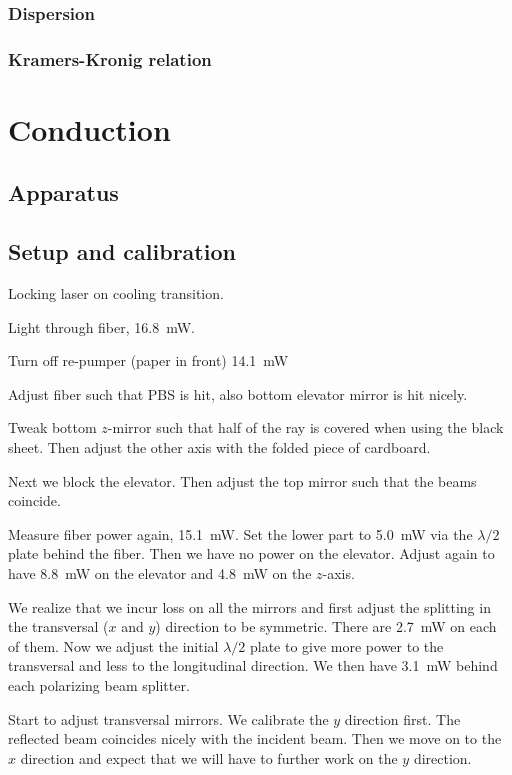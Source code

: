 \documentclass[11pt, english, fleqn, DIV=15, headinclude, BCOR=2cm]{scrreprt}
\begin{document}
\subsection{Dispersion}

\subsection{Kramers-Kronig relation}

\chapter{Conduction}

\section{Apparatus}

\section{Setup and calibration}

Locking laser on cooling transition.

Light through fiber, \SI{16.8}{\milli\watt}.

Turn off re-pumper (paper in front) \SI{14.1}{\milli\watt}

Adjust fiber such that PBS is hit, also bottom elevator mirror is hit nicely.

Tweak bottom $z$-mirror such that half of the ray is covered when using the
black sheet. Then adjust the other axis with the folded piece of cardboard.

Next we block the elevator. Then adjust the top mirror such that the beams
coincide.

Measure fiber power again, \SI{15.1}{\milli\watt}. Set the lower part to
\SI{5.0}{\milli\watt} via the $\lambda/2$ plate behind the fiber. Then we have
no power on the elevator. Adjust again to have \SI{8.8}{\milli\watt} on the
elevator and \SI{4.8}{\milli\watt} on the $z$-axis.

We realize that we incur loss on all the mirrors and first adjust the splitting
in the transversal ($x$ and $y$) direction to be symmetric. There are
\SI{2.7}{\milli\watt} on each of them. Now we adjust the initial $\lambda/2$
plate to give more power to the transversal and less to the longitudinal
direction. We then have \SI{3.1}{\milli\watt} behind each polarizing beam
splitter.

Start to adjust transversal mirrors. We calibrate the $y$ direction first. The
reflected beam coincides nicely with the incident beam. Then we move on to the
$x$ direction and expect that we will have to further work on the $y$
direction. 
\end{document}
